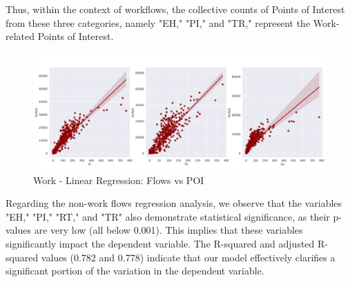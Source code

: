         Thus, within the context of workflows, the collective counts of Points of Interest from these three categories, namely "EH," "PI," and "TR," represent the Work-related Points of Interest.

        \begin{figure}[H]
            \centering
            \includegraphics[width=14cm]{Images/regression_work.png}
            \caption{Work - Linear Regression: Flows vs POI}
            \label{fig: Regression_work}
        \end{figure}

        Regarding the non-work flows regression analysis, we observe that the variables "EH," "PI," "RT," and "TR" also demonstrate statistical significance, as their p-values are very low (all below 0.001). This implies that these variables significantly impact the dependent variable. The R-squared and adjusted R-squared values (0.782 and 0.778) indicate that our model effectively clarifies a significant portion of the variation in the dependent variable.  

